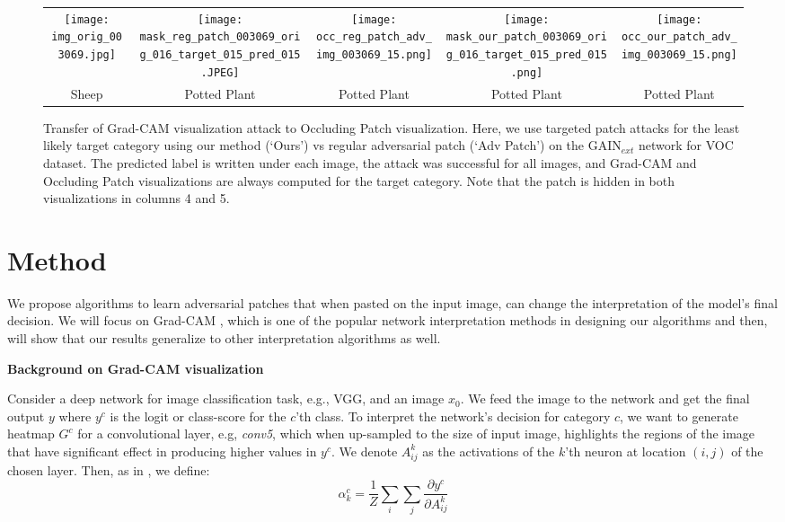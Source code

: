 \documentclass[10pt,twocolumn,letterpaper]{article}
\begin{document}
\begin{figure*}[h]
\begin{center}
\begin{tabular}{| c c c c c|}
\texttt{[image: img\_orig\_003069.jpg]}&
\texttt{[image: mask\_reg\_patch\_003069\_orig\_016\_target\_015\_pred\_015.JPEG]}&
\texttt{[image: occ\_reg\_patch\_adv\_img\_003069\_15.png]}&
\texttt{[image: mask\_our\_patch\_003069\_orig\_016\_target\_015\_pred\_015.png]}&
\texttt{[image: occ\_our\_patch\_adv\_img\_003069\_15.png]}\\
Sheep & Potted Plant & Potted Plant & Potted Plant & Potted Plant \\
\hline
\end{tabular}
\vspace{.05in}
  \caption{Transfer of Grad-CAM visualization attack to Occluding Patch visualization. Here, we use targeted patch attacks for the least likely target category using our method (`Ours') vs regular adversarial patch (`Adv Patch') on the GAIN{$_{ext}$} \cite{kunpeng2018gain} network for VOC dataset. The predicted label is written under each image, the attack was successful for all images, and Grad-CAM and Occluding Patch visualizations are always computed for the target category. Note that the patch is hidden in both visualizations in columns 4 and 5.}
\label{fig_transfer}
  \end{center}

\end{figure*}

\section{Method}
We propose algorithms to learn adversarial patches that when pasted on the input image, can change the interpretation of the model's final decision. We will focus on Grad-CAM \cite{selvaraju2016grad}, which is one of the popular network interpretation methods in designing our algorithms and then, will show that our results generalize to other interpretation algorithms as well.

{\bf Background on Grad-CAM visualization} %

Consider a deep network for image classification task, e.g., VGG, and an image $x_0$. We feed the image to the network and get the final output $y$  where $y^c$ is the logit or class-score for the $c$'th  class. To interpret the network's decision for category $c$, we want to generate heatmap $G^c$ for a convolutional layer, e.g, {\em conv5}, which when up-sampled to the size of input image, highlights the regions of the image that have significant effect in producing higher values in $y^c$. We denote $A^k_{ij}$ as the activations of the $k$'th neuron at location $(i,j)$ of the chosen layer. Then, as in \cite{selvaraju2016grad}, we define:
$$\alpha^c_k = \frac{1}{Z}\sum_{i}\sum_{j}{\frac{\partial y^c}{\partial A^k_{ij}}}$$
\end{document}
